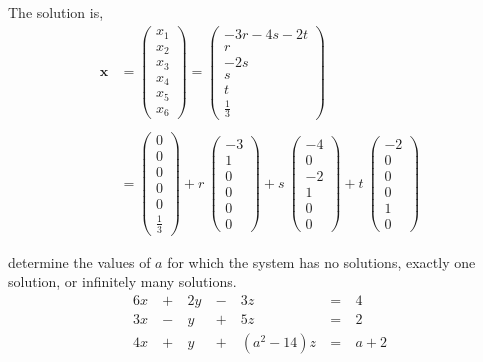 \documentclass[12pt]{article}
\begin{document}
\vspace{2ex}
The solution is,
\begin{align*}
\mathbf{x}&=\left(\begin{array}{c}
   x_1 \\ x_2 \\ x_3 \\ x_4 \\ x_5 \\ x_6
\end{array}\right)=\left(\begin{array}{c}
   -3r-4s-2t \\ r \\ -2s \\ s \\ t \\ \frac{1}{3}
\end{array}\right) \\&\\
&=\left(\begin{array}{c}
   0 \\ 0 \\ 0 \\ 0 \\ 0 \\ \frac{1}{3}
\end{array}\right)
+r\ \left(\begin{array}{c}
   -3 \\ 1 \\ 0 \\ 0 \\ 0 \\ 0
\end{array}\right)
+s\ \left(\begin{array}{c}
   -4 \\ 0 \\ -2 \\ 1 \\ 0 \\ 0
\end{array}\right)
+t\ \left(\begin{array}{c}
   -2 \\ 0 \\ 0 \\ 0 \\ 1 \\ 0
\end{array}\right)
\end{align*}


\vspace{10ex}
 determine the values of $a$ for which the system has no solutions, exactly one solution, or infinitely many solutions.
\begin{alignat*}{6}
   x &\ +\ & 2y &\ -\ & 3z &\ =\ & 4 \\
   3x &\ -\ & y &\ +\ & 5z &\ =\ & 2 \\
   4x &\ +\ & y &\ +\ & (a^2-14)z &\ =\ & a+2
\end{alignat*}
\end{document}
